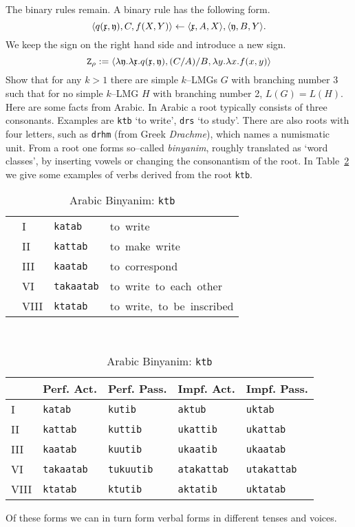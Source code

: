 The binary rules remain. A binary rule has the following form.
\begin{equation}
\langle q(\mathfrak{x}, \mathfrak{y}), C, f(X,Y)\rangle \leftarrow
    \langle \mathfrak{x}, A, X\rangle, \langle \mathfrak{y}, B, Y\rangle.
\end{equation}
We keep the sign on the right hand side and introduce a
new sign.
\begin{equation}
\mbox{\tt Z}_{\rho} :=
    \langle \lambda \mathfrak{y}.\lambda \mathfrak{x}.q(\mathfrak{x},\mathfrak{y}),
    (C/A)/B, \lambda y.\lambda x.f(x,y)\rangle
\end{equation}
\vplatz
\exercise
Show that for any $k > 1$ there are simple $k$--LMGs $G$
with branching number $3$ such that for no simple $k$--LMG
$H$ with branching number 2, $L(G) = L(H)$.
\vplatz
\exercise
\label{ex:arabic}
Here are some facts from Arabic.
In Arabic a root typically consists of three consonants. 
Examples are {\tt ktb} `to write', {\tt drs} `to study'. There 
are also roots with four letters, such as {\tt drhm} (from Greek
{\it Drachme\/}), which names a numismatic unit. From a
root one forms so--called  {\it binyanim}, roughly translated
as `word classes', by inserting vowels or changing the
consonantism of the root. In Table~\ref{tab:531} we give some 
examples of verbs derived from the root {\tt ktb}.
\begin{table}
\caption{Arabic Binyanim: {\tt ktb}}
\label{tab:531} 
\begin{center}
\begin{tabular}{llll}
 & \mbox{\rm I} & \mbox{\tt katab} & \mbox{\rm to write} \\
 & \mbox{\rm II} & \mbox{\tt kattab} & \mbox{\rm to make write}\\
 & \mbox{\rm III} & \mbox{\tt kaatab} & \mbox{\rm to correspond} \\
 & \mbox{\rm VI} & \mbox{\tt takaatab} & \mbox{\rm to write to each other} \\
 & \mbox{\rm VIII} & \mbox{\tt ktatab} & \mbox{\rm to write, to be inscribed}
\end{tabular} \\[3mm]
\begin{tabular}{lllll}
      & Perf. Act. & Perf. Pass. & Impf. Act. & Impf. Pass. \\\hline
 \mbox{\rm I}    & \mbox{\tt katab} & \mbox{\tt kutib} & 
	\mbox{\tt aktub} & \mbox{\tt uktab} \\
 \mbox{\rm II}   & \mbox{\tt kattab} & \mbox{\tt kuttib} & 
	\mbox{\tt ukattib} & \mbox{\tt ukattab} \\
 \mbox{\rm III}  & \mbox{\tt kaatab} & \mbox{\tt kuutib} & 
	\mbox{\tt ukaatib} & \mbox{\tt ukaatab} \\
 \mbox{\rm VI}   & \mbox{\tt takaatab} & \mbox{\tt tukuutib} & 
	\mbox{\tt atakattab} & \mbox{\tt utakattab} \\
 \mbox{\rm VIII} & \mbox{\tt ktatab} & \mbox{\tt ktutib} & 
	\mbox{\tt aktatib} & \mbox{\tt uktatab}
\end{tabular}
\end{center}
\end{table}
Of these forms we can in turn form verbal forms in different
tenses and voices.

